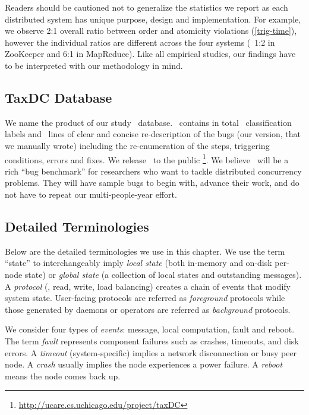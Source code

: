 Readers should be cautioned not to generalize the statistics we report as each
distributed system has unique purpose, design and implementation.
%
For example, we observe 2:1 overall ratio between order and atomicity violations
(\sec\ref{trig-time}), however the individual ratios are different across the four
systems (\eg\ 1:2 in ZooKeeper and 6:1 in MapReduce).  
%
Like all empirical studies, our findings have to be interpreted with our
methodology in mind.


\subsection{TaxDC Database}
\label{met-db}

We name the product of our study \tdc\ database.  \tdc\ contains in
total \numTagsAll\ classification labels and \numDescLOC\ lines of
clear and concise re-description of the bugs (our version, that we
manually wrote) including the re-enumeration of the steps, triggering
conditions, errors and fixes.
%
We release \tdc\ to the public
\footnote{\url{http://ucare.cs.uchicago.edu/project/taxDC}}.  We believe \tdc\
will be a rich ``bug benchmark'' for researchers who want to tackle distributed
concurrency problems.  They will have sample bugs to begin with, advance their
work, and do not have to repeat our multi-people-year effort.



\subsection{Detailed Terminologies}
\label{met-pres}

Below are the detailed terminologies we use in this chapter.
We use the term ``state'' to interchangeably imply {\em local state}
(both in-memory and on-disk per-node state) or {\em global state}
(a collection of local states and outstanding messages).
%
A {\em protocol} (\eg, read, write, load balancing) creates a chain of
events that modify system state.
%
User-facing protocols are referred as {\em foreground} protocols while
those generated by daemons or operators are referred
as {\em background} protocols.


We consider four types of {\em events}: message, local computation,
fault and reboot.  The term {\em fault} represents component failures
such as crashes, timeouts, and disk errors.
%
A {\em timeout} (system-specific) implies a network disconnection
or busy peer node.
%
A {\em crash} usually implies the node experiences a power failure. %
%
A {\em reboot} means the node comes back up.


